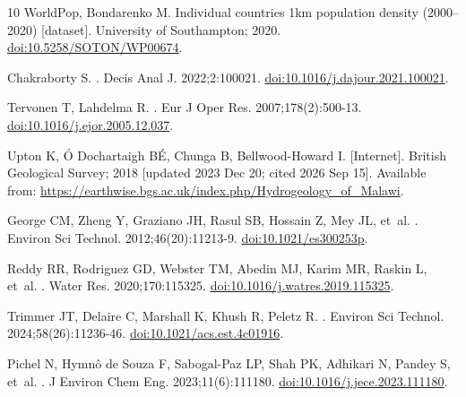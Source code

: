 \documentclass[10pt,letterpaper]{article}
\begin{document}
\begin{thebibliography}{10}
{WorldPop}, {Bondarenko} M. {Individual countries 1km population density
  (2000--2020)} [dataset]. University of Southampton; 2020.
\newblock \href {http://dx.doi.org/10.5258/SOTON/WP00674}
  {doi:10.5258/SOTON/WP00674}.

{Chakraborty} S.
.
\newblock Decis Anal J. 2022;2:100021.
\newblock \href {http://dx.doi.org/10.1016/j.dajour.2021.100021}
  {doi:10.1016/j.dajour.2021.100021}.

{Tervonen} T, {Lahdelma} R.
.
\newblock Eur J Oper Res. 2007;178(2):500-13.
\newblock \href {http://dx.doi.org/10.1016/j.ejor.2005.12.037}
  {doi:10.1016/j.ejor.2005.12.037}.

{Upton} K, {{\'O} Dochartaigh} B{\'E}, {Chunga} B, {Bellwood-Howard} I.
 [Internet].
  British Geological Survey; 2018 [updated 2023 Dec 20; cited 2026 Sep 15].
\newblock Available from:
  \url{https://earthwise.bgs.ac.uk/index.php/Hydrogeology_of_Malawi}.

{George} CM, {Zheng} Y, {Graziano} JH, {Rasul} SB, {Hossain} Z, {Mey} JL,
  et~al.
.
\newblock Environ Sci Technol. 2012;46(20):11213-9.
\newblock \href {http://dx.doi.org/10.1021/es300253p} {doi:10.1021/es300253p}.

{Reddy} RR, {Rodriguez} GD, {Webster} TM, {Abedin} MJ, {Karim} MR, {Raskin} L,
  et~al.
.
\newblock Water Res. 2020;170:115325.
\newblock \href {http://dx.doi.org/10.1016/j.watres.2019.115325}
  {doi:10.1016/j.watres.2019.115325}.

{Trimmer} JT, {Delaire} C, {Marshall} K, {Khush} R, {Peletz} R.
.
\newblock Environ Sci Technol. 2024;58(26):11236-46.
\newblock \href {http://dx.doi.org/10.1021/acs.est.4c01916}
  {doi:10.1021/acs.est.4c01916}.

{Pichel} N, {Hymn{\^o} de Souza} F, {Sabogal-Paz} LP, {Shah} PK, {Adhikari} N,
  {Pandey} S, et~al.
.
\newblock J Environ Chem Eng. 2023;11(6):111180.
\newblock \href {http://dx.doi.org/10.1016/j.jece.2023.111180}
  {doi:10.1016/j.jece.2023.111180}.


\end{thebibliography}
\end{document}
